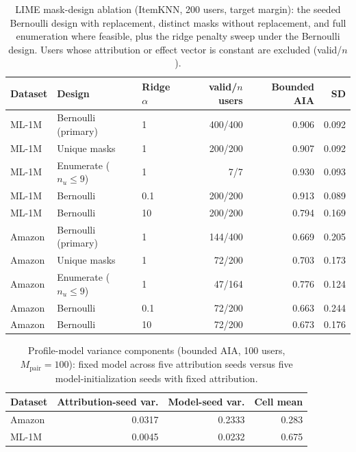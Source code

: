 \begin{table}[!htbp]\centering\scriptsize\setlength{\tabcolsep}{3pt}
\caption{LIME mask-design ablation (ItemKNN, 200 users, target margin):
the seeded Bernoulli design with replacement, distinct masks without
replacement, and full enumeration where feasible, plus the ridge penalty
sweep under the Bernoulli design. Users whose attribution or effect vector
is constant are excluded (valid/$n$).}
\label{tab:review5-lime-masks}
\begin{tabular}{@{}lllrrr@{}}
\toprule
Dataset & Design & Ridge $\alpha$ & valid/$n$ users & Bounded AIA & SD \\
\midrule
ML-1M & Bernoulli (primary) & 1 & 400/400 & 0.906 & 0.092 \\
ML-1M & Unique masks & 1 & 200/200 & 0.907 & 0.092 \\
ML-1M & Enumerate ($n_u\le9$) & 1 & 7/7 & 0.930 & 0.093 \\
ML-1M & Bernoulli & 0.1 & 200/200 & 0.913 & 0.089 \\
ML-1M & Bernoulli & 10 & 200/200 & 0.794 & 0.169 \\
Amazon & Bernoulli (primary) & 1 & 144/400 & 0.669 & 0.205 \\
Amazon & Unique masks & 1 & 72/200 & 0.703 & 0.173 \\
Amazon & Enumerate ($n_u\le9$) & 1 & 47/164 & 0.776 & 0.124 \\
Amazon & Bernoulli & 0.1 & 72/200 & 0.663 & 0.244 \\
Amazon & Bernoulli & 10 & 72/200 & 0.673 & 0.176 \\
\bottomrule
\end{tabular}
\end{table}
\begin{table}[!htbp]\centering\scriptsize\setlength{\tabcolsep}{3pt}
\caption{Profile-model variance components (bounded AIA, 100 users,
$M_{\mathrm{pair}}=100$): fixed model across five attribution seeds versus
five model-initialization seeds with fixed attribution.}
\label{tab:review5-variance}
\begin{tabular}{@{}lrrr@{}}
\toprule
Dataset & Attribution-seed var. & Model-seed var. & Cell mean \\
\midrule
Amazon & 0.0317 & 0.2333 & 0.283 \\
ML-1M & 0.0045 & 0.0232 & 0.675 \\
\bottomrule
\end{tabular}
\end{table}
